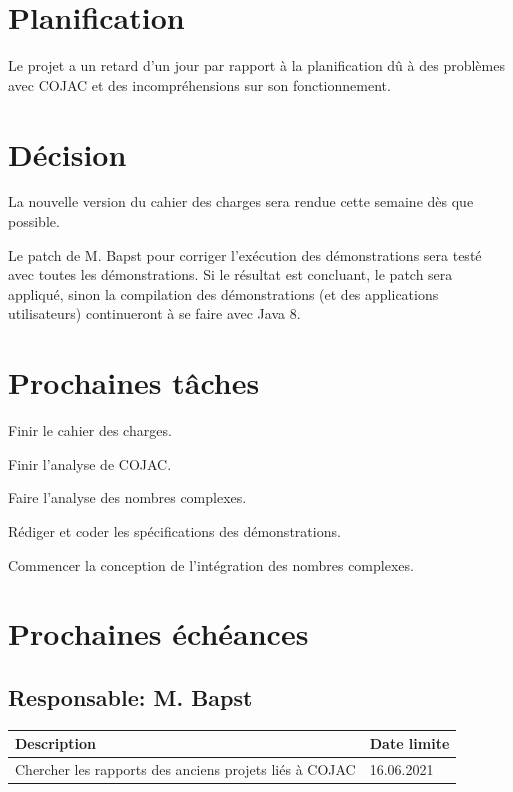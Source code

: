 \documentclass[11pt]{meetingmins}
\begin{document}
\section{Planification}
\begin{hiddenitems}
    \item Le projet a un retard d'un jour par rapport à la planification dû à des problèmes avec COJAC et des incompréhensions sur son fonctionnement.
\end{hiddenitems}

\section{Décision}
\begin{hiddenitems}
    \item La nouvelle version du cahier des charges sera rendue cette semaine dès que possible.
    \item Le patch de M. Bapst pour corriger l'exécution des démonstrations sera testé avec toutes les démonstrations. Si le résultat est concluant, le patch sera appliqué, sinon la compilation des démonstrations (et des applications utilisateurs) continueront à se faire avec Java 8.
\end{hiddenitems}

\section{Prochaines tâches}
\begin{hiddenitems}
    \item Finir le cahier des charges.
    \item Finir l'analyse de COJAC.
    \item Faire l'analyse des nombres complexes.
    \item Rédiger et coder les spécifications des démonstrations.
    \item Commencer la conception de l'intégration des nombres complexes.
\end{hiddenitems}

\section{Prochaines échéances}
\subsection{Responsable: M. Bapst}

\begin{table}[ht]
    \begin{tabularx}{\columnwidth}{ | X | p{8em} |}
        \hline
        \textbf{Description} & \textbf{Date limite} \\
        \hline
        Chercher les rapports des anciens projets liés à COJAC & 16.06.2021 \\
        \hline
    \end{tabularx}
\end{table}
\end{document}
